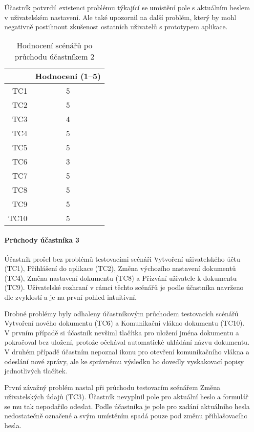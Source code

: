 Účastník potvrdil existenci problému týkající se umístění pole s aktuálním heslem v uživatelském nastavení.
Ale také upozornil na další problém, který by mohl negativně postihnout zkušenost ostatních uživatelů s prototypem aplikace.

\begin{table}[ht!]
    \centering
    \caption{Hodnocení scénářů po průchodu účastníkem 2}
    \label{tab:poPrůchoduÚčastníkem2}
    \begin{tabular}{r|c}
        & Hodnocení (1--5) \\ \hline
        TC1 & 5 \\
        TC2 & 5 \\
        TC3 & 4 \\
        TC4 & 5 \\
        TC5 & 5 \\
        TC6 & 3 \\
        TC7 & 5 \\
        TC8 & 5 \\
        TC9 & 5 \\
        TC10 & 5 \\
    \end{tabular}
\end{table}

\paragraph{Průchody účastníka 3}

Účastník prošel bez problémů testovacími scénáři Vytvoření uživatelského účtu (TC1), Přihlášení do aplikace (TC2), Změna výchozího nastavení dokumentů (TC4), Změna nastavení dokumentu (TC8) a Přizvání uživatele k dokumentu (TC9).
Uživatelské rozhraní v rámci těchto scénářů je podle účastníka navrženo dle zvyklostí a je na první pohled intuitivní.

Drobné problémy byly odhaleny účastníkovým průchodem testovacích scénářů Vytvoření nového dokumentu (TC6) a Komunikační vlákno dokumentu (TC10).
V prvním případě si účastník nevšiml tlačítka pro uložení jména dokumentu a pokračoval bez uložení, protože očekával automatické ukládání názvu dokumentu.
V druhém případě účastním nepoznal ikonu pro otevření komunikačního vlákna a odeslání nové zprávy, ale ke správnému výsledku ho dovedly vyskakovací popisy jednotlivých tlačítek.

První závažný problém nastal při průchodu testovacím scénářem Změna uživatelských údajů (TC3).
Účastník nevyplnil pole pro aktuální heslo a formulář se mu tak nepodařilo odeslat.
Podle účastníka je pole pro zadání aktuálního hesla nedostatečně označené a svým umístěním spadá pouze pod změnu přihlašovacího hesla.

